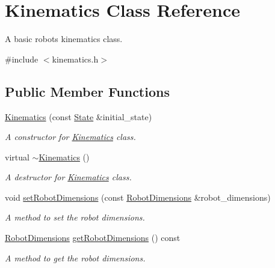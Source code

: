 \hypertarget{classKinematics}{}\section{Kinematics Class Reference}
\label{classKinematics}


A basic robot\textquotesingle{}s kinematics class.  




{\ttfamily \#include $<$kinematics.\+h$>$}

\subsection*{Public Member Functions}
\begin{DoxyCompactItemize}
\item 
\hyperlink{classKinematics_adb48748237fe9076e7d8aac5b435e95f}{Kinematics} (const \hyperlink{structState}{State} \&initial\+\_\+state)
\begin{DoxyCompactList}\small\item\em A constructor for \hyperlink{classKinematics}{Kinematics} class. \end{DoxyCompactList}\item 
\mbox{\label{classKinematics_ae84a8ae43ee20a8573f7e51471d159b5}} 
virtual \hyperlink{classKinematics_ae84a8ae43ee20a8573f7e51471d159b5}{$\sim$\+Kinematics} ()
\begin{DoxyCompactList}\small\item\em A destructor for \hyperlink{classKinematics}{Kinematics} class. \end{DoxyCompactList}\item 
void \hyperlink{classKinematics_aee778602a6079e9ac4db804b6b3e4547}{set\+Robot\+Dimensions} (const \hyperlink{structRobotDimensions}{Robot\+Dimensions} \&robot\+\_\+dimensions)
\begin{DoxyCompactList}\small\item\em A method to set the robot dimensions. \end{DoxyCompactList}\item 
\hyperlink{structRobotDimensions}{Robot\+Dimensions} \hyperlink{classKinematics_a8f16185dd4942d6423d3ac4997de839f}{get\+Robot\+Dimensions} () const
\begin{DoxyCompactList}\small\item\em A method to get the robot dimensions. \end{DoxyCompactList}\item 

\end{DoxyCompactItemize}
